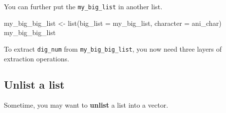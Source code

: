 \documentclass[
]{book}
\newenvironment{Shaded}{\begin{snugshade}}{\end{snugshade}}
\newcommand{\AttributeTok}[1]{\textcolor[rgb]{0.77,0.63,0.00}{#1}}
\newcommand{\CommentTok}[1]{\textcolor[rgb]{0.56,0.35,0.01}{\textit{#1}}}
\newcommand{\DecValTok}[1]{\textcolor[rgb]{0.00,0.00,0.81}{#1}}
\newcommand{\FunctionTok}[1]{\textcolor[rgb]{0.00,0.00,0.00}{#1}}
\newcommand{\NormalTok}[1]{#1}
\newcommand{\OtherTok}[1]{\textcolor[rgb]{0.56,0.35,0.01}{#1}}
\newcommand{\SpecialCharTok}[1]{\textcolor[rgb]{0.00,0.00,0.00}{#1}}
\begin{document}
You can further put the \texttt{my\_big\_list} in another list.

\begin{Shaded}
\begin{Highlighting}[]
\NormalTok{my\_big\_big\_list }\OtherTok{\textless{}{-}} \FunctionTok{list}\NormalTok{(}\AttributeTok{big\_list =}\NormalTok{ my\_big\_list,  }\AttributeTok{character =}\NormalTok{ ani\_char)}
\NormalTok{my\_big\_big\_list}
\end{Highlighting}
\end{Shaded}

To extract \texttt{dig\_num} from \texttt{my\_big\_big\_list}, you now need three layers of extraction operations.

\begin{Shaded}
\end{Shaded}

\hypertarget{unlist-a-list}{%
\subsection{Unlist a list}\label{unlist-a-list}}

Sometime, you may want to \textbf{unlist} a list into a vector.
\end{document}
